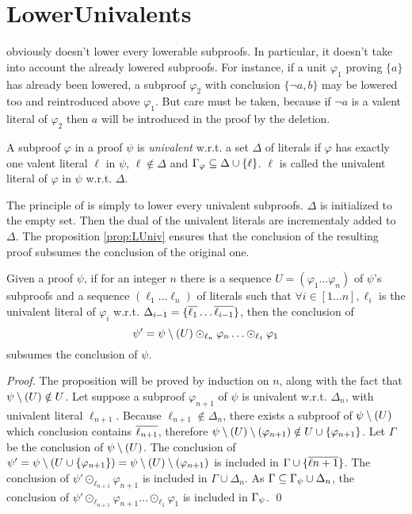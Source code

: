 \documentclass{llncs}
\begin{document}
\section{LowerUnivalents} \label{sec:LUniv}

{\LowerUnits} obviously doesn't lower every lowerable subproofs. In particular, it doesn't take into
account the already lowered subproofs. For instance, if a unit $\varphi_1$ proving $\{a\}$ has
already been lowered, a subproof $\varphi_2$ with conclusion $\{\neg a,b\}$ may be lowered too and
reintroduced above $\varphi_1$. But care must be taken, because if $\neg a$ is a valent literal of
$\varphi_2$ then $a$ will be introduced in the proof by the deletion.

\begin{definition}
A subproof $\varphi$ in a proof $\psi$ is \emph{univalent} w.r.t. a set $\Delta$ of literals if
$\varphi$ has exactly one valent literal $\ell$ in $\psi$, $\ell \notin \Delta$ and
$\Gamma_{\varphi} \subseteq \Delta \cup \left\{ \ell \right\}$. $\ell$ is called the univalent
literal of $\varphi$ in $\psi$ w.r.t.  $\Delta$.
\end{definition}

The principle of {\LowerUnivalents} is simply to lower every univalent subproofs. $\Delta$ is
initialized to the empty set. Then the dual of the univalent literals are incrementaly added to
$\Delta$. The proposition \ref{prop:LUniv} ensures that the conclusion of the resulting proof
subsumes the conclusion of the original one.

\begin{proposition} \label{prop:LUniv}
Given a proof $\psi$, if for an integer $n$ there is a sequence $U = (\varphi_1 \ldots \varphi_n)$
of $\psi$'s subproofs and a sequence $(\ell_1 \ldots \ell_n)$ of literals such that $\forall i \in
[1 \ldots n], \ell_i$ is the univalent literal of $\varphi_i$ w.r.t. $\Delta_{i-1} = \{\overline{\ell_1}
\ldots \overline{\ell_{i-1}}\}$, then the conclusion of
$$ \psi' = \psi \setminus (U) \odot_{\ell_n} \varphi_n \ldots \odot_{\ell_1} \varphi_1 $$
subsumes the conclusion of $\psi$.
\end{proposition}

\begin{proof}
The proposition will be proved by induction on $n$, along with the fact that $\psi \setminus (U) \notin
U$. Let suppose a subproof $\varphi_{n+1}$ of $\psi$ is univalent w.r.t. $\Delta_n$, with univalent
literal $\ell_{n+1}$.  Because $\ell_{n+1} \notin \Delta_n$, there exists a subproof of
$\psi \setminus (U)$ which conclusion contains $\overline{\ell_{n+1}}$, therefore
$\psi \setminus (U) \setminus (\varphi_{n+1}) \notin U \cup \{\varphi_{n+1}\}$.  Let $\Gamma$ be the conclusion
of $\psi \setminus (U)$. The conclusion of $ \psi' = \psi \setminus (U \cup \{\varphi_{n+1}\}) =
\psi \setminus (U) \setminus (\varphi_{n+1}) $ is included in $\Gamma \cup \{\overline{\ell{n+1}}\}$. The conclusion
of $\psi' \odot_{\ell_{n+1}} \varphi_{n+1}$ is included in $\Gamma \cup \Delta_n$. As $\Gamma
\subseteq \Gamma_{\psi} \cup \Delta_n$, the conclusion of $\psi' \odot_{\ell_{n+1}}
\varphi_{n+1} \ldots \odot_{\ell_1} \varphi_1$ is included in $\Gamma_{\psi}$. \qed
\end{proof}
\end{document}
